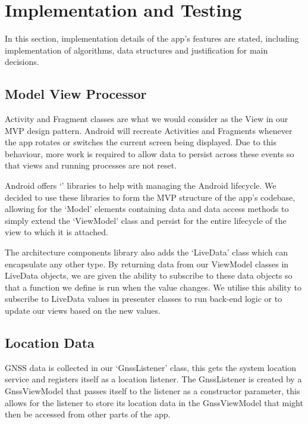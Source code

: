 \section{Implementation and Testing}\label{sec:implementation-and-testing}
In this section, implementation details of the app's features are stated, including implementation of algorithms, data structures and justification for main decisions.


\subsection{Model View Processor}\label{subsec:mvp}
Activity and Fragment classes are what we would consider as the View in our MVP design pattern.
Android will recreate Activities and Fragments whenever the app rotates or switches the current screen being displayed. Due to this behaviour, more work is required to allow data to persist across these events so that views and running processes are not reset.

Android offers `' libraries to help with managing the Android lifecycle.
We decided to use these libraries to form the MVP structure of the app's codebase, allowing for the `Model' elements containing data and data access methods to simply extend the `ViewModel' class and persist for the entire lifecycle of the view to which it is attached.

The architecture components library also adds the `LiveData' class which can encapsulate any other type. By returning data from our ViewModel classes in LiveData objects, we are given the ability to subscribe to these data objects so that a function we define is run when the value changes. We utilise this ability to subscribe to LiveData values in presenter classes to run back-end logic or to update our views based on the new values.

\subsection{Location Data}\label{subsec:location-data}
GNSS data is collected in our `GnssListener' class, this gets the system location service and registers itself as a location listener. The GnssListener is created by a GnssViewModel that passes itself to the listener as a constructor parameter, this allows for the listener to store its location data in the GnssViewModel that might then be accessed from other parts of the app.

